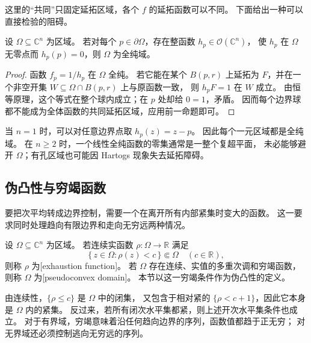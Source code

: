 这里的“共同”只固定延拓区域，各个 \(f\) 的延拓函数可以不同。
下面给出一种可以直接检验的阻碍。

\begin{proposition}[边界零点给出的延拓障碍]\label{b3:prop:29-holomorphic-boundary-obstruction}
设 \(\Omega\subseteq\mathbb C^n\) 为区域。
若对每个 \(p\in\partial\Omega\)，存在整函数 \(h_p\in\mathcal O(\mathbb C^n)\)，
使 \(h_p\) 在 \(\Omega\) 无零点而 \(h_p(p)=0\)，则 \(\Omega\) 为全纯域。
\end{proposition}
\begin{proof}
函数 \(f_p=1/h_p\) 在 \(\Omega\) 全纯。
若它能在某个 \(B(p,r)\) 上延拓为 \(F\)，并在一个非空开集
\(W\subseteq\Omega\cap B(p,r)\) 上与原函数一致，
则 \(h_pF=1\) 在 \(W\) 成立。
由恒等原理，这个等式在整个球内成立；在 \(p\) 处却给 \(0=1\)，矛盾。
因而每个边界球都不能成为全体函数的共同延拓区域，应用前一命题即可。
\end{proof}

当 \(n=1\) 时，可以对任意边界点取 \(h_p(z)=z-p\)。
因此每个一元区域都是全纯域。
在 \(n\ge2\) 时，一个线性全纯函数的零集通常是一整个复超平面，
未必能够避开 \(\Omega\)；有孔区域也可能因 Hartogs 现象失去延拓障碍。

\subsection{伪凸性与穷竭函数}
\label{b3:subsec:290402}

要把次平均转成边界控制，需要一个在离开所有内部紧集时变大的函数。
这一要求同时处理趋向有限边界和走向无穷远两种情况。

\begin{definition}\label{b3:def:29-pseudoconvex}
设 \(\Omega\subseteq\mathbb C^n\) 为区域。
若连续实函数 \(\rho:\Omega\to\mathbb R\) 满足
\[
 \{\,z\in\Omega:\rho(z)<c\,\}\Subset\Omega
 \quad(c\in\mathbb R),
\]
则称 \(\rho\) 为[exhaustion function]。
若 \(\Omega\) 存在连续、实值的多重次调和穷竭函数，
则称 \(\Omega\) 为[pseudoconvex domain]。
本节以这一穷竭条件作为伪凸性的定义。
\end{definition}

由连续性，\(\{\rho\le c\}\) 是 \(\Omega\) 中的闭集，
又包含于相对紧的 \(\{\rho<c+1\}\)，因此它本身是 \(\Omega\) 内的紧集。
反过来，若所有闭次水平集都紧，则上述开次水平集条件也成立。
对于有界域，穷竭意味着沿任何趋向边界的序列，函数值都趋于正无穷；
对无界域还必须控制逃向无穷远的序列。

